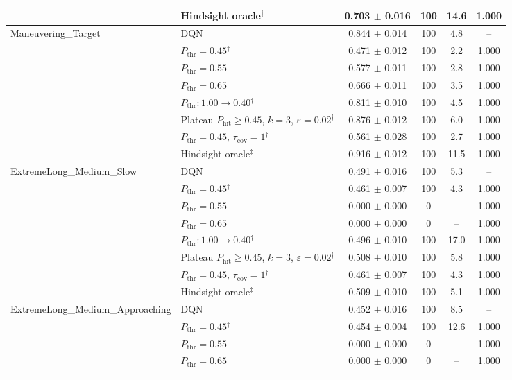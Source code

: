 \begin{table}[htbp]
\begin{tabular}{llcccc}
 & Hindsight oracle$^{\ddagger}$ & 0.703 $\pm$ 0.016 & 100 & 14.6 & 1.000 \\
\midrule
\multirow{8}{*}{Maneuvering\_Target} & DQN & 0.844 $\pm$ 0.014 & 100 & 4.8 & -- \\
 & $P_{\mathrm{thr}}=0.45$$^{\dagger}$ & 0.471 $\pm$ 0.012 & 100 & 2.2 & 1.000 \\
 & $P_{\mathrm{thr}}=0.55$ & 0.577 $\pm$ 0.011 & 100 & 2.8 & 1.000 \\
 & $P_{\mathrm{thr}}=0.65$ & 0.666 $\pm$ 0.011 & 100 & 3.5 & 1.000 \\
 & $P_{\mathrm{thr}}: 1.00 \to 0.40$$^{\dagger}$ & 0.811 $\pm$ 0.010 & 100 & 4.5 & 1.000 \\
 & Plateau $P_{\mathrm{hit}}\geq0.45$, $k=3$, $\varepsilon=0.02$$^{\dagger}$ & 0.876 $\pm$ 0.012 & 100 & 6.0 & 1.000 \\
 & $P_{\mathrm{thr}}=0.45$, $\tau_{\mathrm{cov}}=1$$^{\dagger}$ & 0.561 $\pm$ 0.028 & 100 & 2.7 & 1.000 \\
 & Hindsight oracle$^{\ddagger}$ & 0.916 $\pm$ 0.012 & 100 & 11.5 & 1.000 \\
\midrule
\multirow{8}{*}{ExtremeLong\_Medium\_Slow} & DQN & 0.491 $\pm$ 0.016 & 100 & 5.3 & -- \\
 & $P_{\mathrm{thr}}=0.45$$^{\dagger}$ & 0.461 $\pm$ 0.007 & 100 & 4.3 & 1.000 \\
 & $P_{\mathrm{thr}}=0.55$ & 0.000 $\pm$ 0.000 & 0 & -- & 1.000 \\
 & $P_{\mathrm{thr}}=0.65$ & 0.000 $\pm$ 0.000 & 0 & -- & 1.000 \\
 & $P_{\mathrm{thr}}: 1.00 \to 0.40$$^{\dagger}$ & 0.496 $\pm$ 0.010 & 100 & 17.0 & 1.000 \\
 & Plateau $P_{\mathrm{hit}}\geq0.45$, $k=3$, $\varepsilon=0.02$$^{\dagger}$ & 0.508 $\pm$ 0.010 & 100 & 5.8 & 1.000 \\
 & $P_{\mathrm{thr}}=0.45$, $\tau_{\mathrm{cov}}=1$$^{\dagger}$ & 0.461 $\pm$ 0.007 & 100 & 4.3 & 1.000 \\
 & Hindsight oracle$^{\ddagger}$ & 0.509 $\pm$ 0.010 & 100 & 5.1 & 1.000 \\
\midrule
\multirow{8}{*}{ExtremeLong\_Medium\_Approaching} & DQN & 0.452 $\pm$ 0.016 & 100 & 8.5 & -- \\
 & $P_{\mathrm{thr}}=0.45$$^{\dagger}$ & 0.454 $\pm$ 0.004 & 100 & 12.6 & 1.000 \\
 & $P_{\mathrm{thr}}=0.55$ & 0.000 $\pm$ 0.000 & 0 & -- & 1.000 \\
 & $P_{\mathrm{thr}}=0.65$ & 0.000 $\pm$ 0.000 & 0 & -- & 1.000 \\
$$
\end{tabular}
\end{table}
